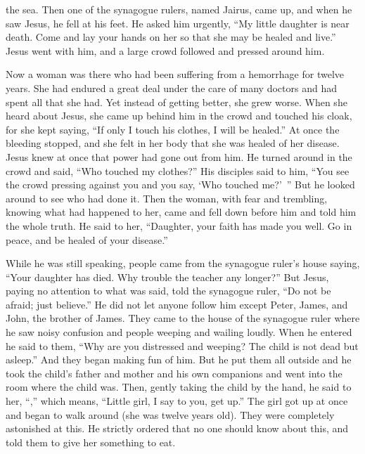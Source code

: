 {the sea.
Then
one
of the synagogue rulers,
named
Jairus,
came up,
and
when
he saw
Jesus,
he fell
at
his
feet.
He
asked
him
urgently,
“My
little daughter
is near death.
Come
and lay
your hands
on her
so that
she may be healed
and
live.”
Jesus went
with
him,
and
a large
crowd
followed
and
pressed around
him.
\par }{\PP {}Now
a woman
was there who had been suffering
from
a hemorrhage
for twelve
years.
She had endured
a great deal
under
the care of many
doctors
and
had spent
all
that
she had.
Yet
instead
of getting better,
she grew
worse.
When
she heard
about
Jesus,
she came up
behind
him in
the crowd
and touched
his
cloak,
for
she kept saying, “If
only
I touch
his
clothes,
I will be healed.”
At once
the bleeding
stopped,
and
she felt
in her
body
that
she was healed
of
her disease.
Jesus
knew
at once
that power
had gone out
from
him.
He turned around
in
the crowd
and said,
“Who
touched
my
clothes?”
His
disciples
said
to him,
“You see
the crowd
pressing against
you
and
you say,
‘Who
touched
me?’ ”
But
he looked around
to see
who had done
it.
Then
the woman,
with fear
and
trembling,
knowing
what
had happened
to her,
came
and
fell down before
him
and
told
him
the whole
truth.
He said
to her,
“Daughter,
your
faith
has made
you
well.
Go
in
peace,
and
be
healed
of
your
disease.”
\par }{\PP {}While
he
was
still
speaking,
people came
from
the synagogue ruler’s house
saying,
“Your
daughter
has died.
Why
trouble
the teacher
any longer?”
But
Jesus,
paying no attention
to what was said,
told
the synagogue ruler,
“Do
not
be afraid;
just
believe.”
He
did
not
let
anyone
follow
him
except
Peter,
James,
and
John,
the brother
of James.
They came
to
the house
of the synagogue ruler
where he saw
noisy confusion
and
people weeping
and
wailing
loudly.
When
he entered
he said
to them,
“Why
are you distressed
and
weeping? The child
is
not
dead
but
asleep.”
And
they began making fun
of him.
But
he
put
them all
outside
and he took
the child’s
father
and
mother
and
his own companions
and
went into the room
where
the child
was.
Then,
gently taking
the child
by the hand,
he said
to her, “{},” which
means,
“Little girl,
I say
to you,
get up.”
The girl
got up
at once
and began to walk around
(she was
twelve
years
old). They were
completely
astonished at this.
He
strictly
ordered
that
no one
should know
about this,
and
told
them
to give
her
something to eat.

}

